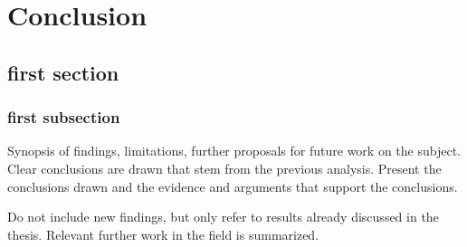 \chapter{Conclusion} \label{ch:conclusion}



\section{first section}
\subsection{first subsection}
 Synopsis of findings, limitations, further proposals for future work on the subject. Clear conclusions are drawn that stem from the previous
analysis. Present the conclusions drawn and the evidence and arguments
that support the conclusions.

Do not include new findings, but only refer to results already discussed in the thesis. Relevant further work in the field is summarized.